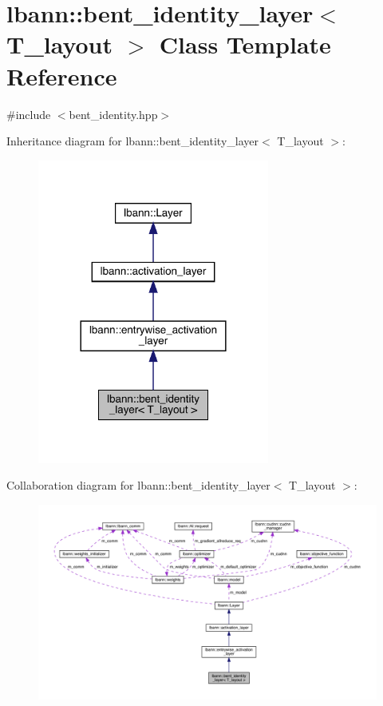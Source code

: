 \hypertarget{classlbann_1_1bent__identity__layer}{}\section{lbann\+:\+:bent\+\_\+identity\+\_\+layer$<$ T\+\_\+layout $>$ Class Template Reference}
\label{classlbann_1_1bent__identity__layer}


{\ttfamily \#include $<$bent\+\_\+identity.\+hpp$>$}



Inheritance diagram for lbann\+:\+:bent\+\_\+identity\+\_\+layer$<$ T\+\_\+layout $>$\+:\nopagebreak
\begin{figure}[H]
\begin{center}
\leavevmode
\includegraphics[width=216pt]{classlbann_1_1bent__identity__layer__inherit__graph}
\end{center}
\end{figure}


Collaboration diagram for lbann\+:\+:bent\+\_\+identity\+\_\+layer$<$ T\+\_\+layout $>$\+:\nopagebreak
\begin{figure}[H]
\begin{center}
\leavevmode
\includegraphics[width=350pt]{classlbann_1_1bent__identity__layer__coll__graph}
\end{center}
\end{figure}
